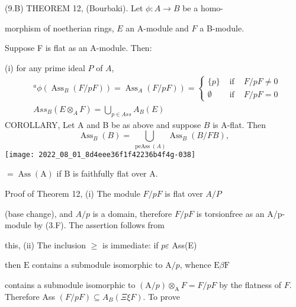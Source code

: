 (9.B) THEOREM 12, (Bourbaki). Let $\phi: A \rightarrow B$ be a homo-

morphism of noetherian rings, $E$ an A-module and $F$ a B-module.

Suppose F is flat as an A-module. Then:

(i) for any prime ideal $P$ of $A$,
$$
\begin{aligned}
&\left.{ }^{a} \phi\left(\operatorname{Ass}_{B}(F / p F)\right)=\operatorname{Ass}_{A}(F / p F)\right)=\left\{\begin{array}{ccc}
\{p\} & \text { if } & F / p F \neq 0 \\
\emptyset & \text { if } & F / p F=0
\end{array}\right. \\
&A s s_{B}\left(E \otimes_{A} F\right)=\bigcup_{p \in A s s} A_{B}(E)
\end{aligned}
$$
COROLLARY, Let A and B be as above and suppose $B$ is A-flat. Then
$$
\operatorname{Ass}_{B}(B)=\bigcup_{\operatorname{peAss}(A)} \operatorname{Ass}_{B}(B / F B),
$$
\texttt{[image: 2022\_08\_01\_8d4eee36f1f42236b4f4g-038]}

$=\operatorname{Ass}(\mathrm{A})$ if $\mathrm{B}$ is faithfully flat over $\mathrm{A}$.

Proof of Theorem 12, (i) The module $F / p F$ is flat over $A / P$

(base change), and $A / p$ is a domain, therefore $F / p F$ is torsionfree as an A/p-module by (3.F). The assertion follows from

this, (ii) The inclusion $\geq$ is immediate: if $p \varepsilon$ Ass(E)

then $\mathrm{E}$ contains a submodule isomorphic to $\mathrm{A} / p$, whence $\mathrm{E} \beta \mathrm{F}$

contains a submodule isomorphic to $(\mathrm{A} / p) \otimes_{\mathrm{A}} F=F / p F$ by the flatness of $F$. Therefore Ass $(F / p F) \subseteq A_{B}(\Xi \xi F)$. To prove

